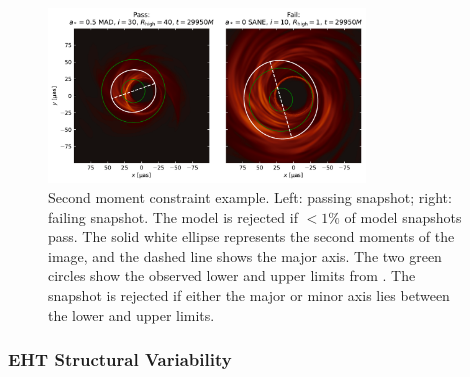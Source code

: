\begin{figure}
  \centering
  \includegraphics[width=0.75\textwidth]{figures/passfail_sz.pdf}
  \caption{Second moment constraint example.  Left: passing snapshot; right: failing snapshot.  The model is rejected if $< 1\%$ of model snapshots pass. The solid white ellipse  represents the second moments of the image, and the dashed line shows the major axis.  The two green circles show the observed lower and upper limits from . The snapshot is rejected if either the major or minor axis lies between the lower and upper limits. 
  }
  \label{fig:passfail_sz}
\end{figure}

\subsubsection{EHT Structural Variability}

